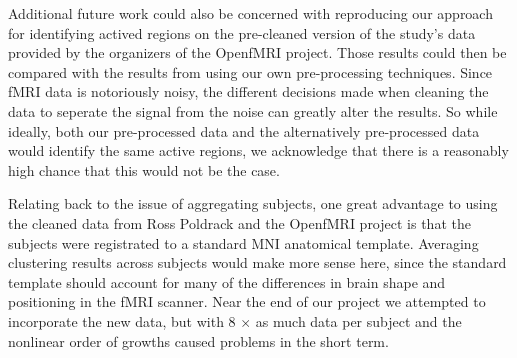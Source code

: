 \par Additional future work could also be concerned with reproducing our 
approach for identifying actived regions on the pre-cleaned version of the 
study's data provided by the organizers of the OpenfMRI project. Those results 
could then be compared with the results from using our own pre-processing 
techniques. Since fMRI data is notoriously noisy, the different decisions made 
when cleaning the data to seperate the signal from the noise can greatly alter 
the results. So while ideally, both our pre-processed data and the 
alternatively pre-processed data would identify the same active regions, we 
acknowledge that there is a reasonably high chance that this would not be the 
case. 

\par Relating back to the issue of aggregating subjects, one great advantage 
to using the cleaned data from Ross Poldrack and the OpenfMRI project is that 
the subjects were registrated to a standard MNI anatomical template. Averaging 
clustering results across subjects would make more sense here, since the 
standard template should account for many of the differences in brain shape 
and positioning in the fMRI scanner. Near the end of our project we attempted
to incorporate the new data, but with 8 $\times$ as much data per subject and 
the nonlinear order of growths caused problems in the short term.
